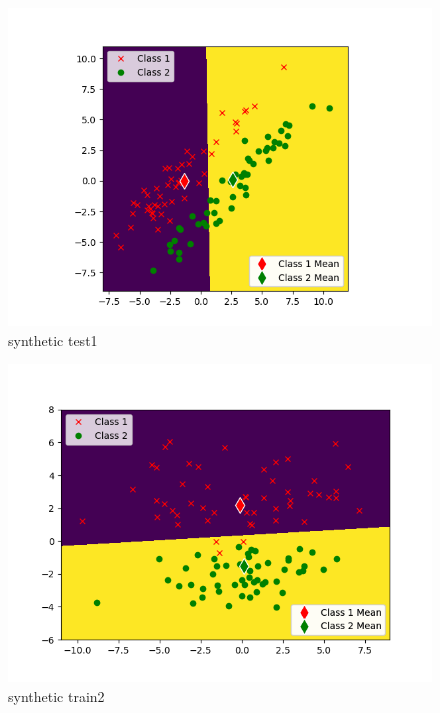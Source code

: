 \documentclass{article}
\begin{document}
	\begin{figure}[hbt!]
		\includegraphics[width=\linewidth]{images/synthetic_test1.png}
		\caption{synthetic test1}
		\label{fig:synthetictest1}
	\end{figure}
	\begin{figure}[hbt!]
		\includegraphics[width=\linewidth]{images/synthetic_train2.png}
		\caption{synthetic train2}
		\label{fig:synthetictrain2}
	\end{figure}
\end{document}
